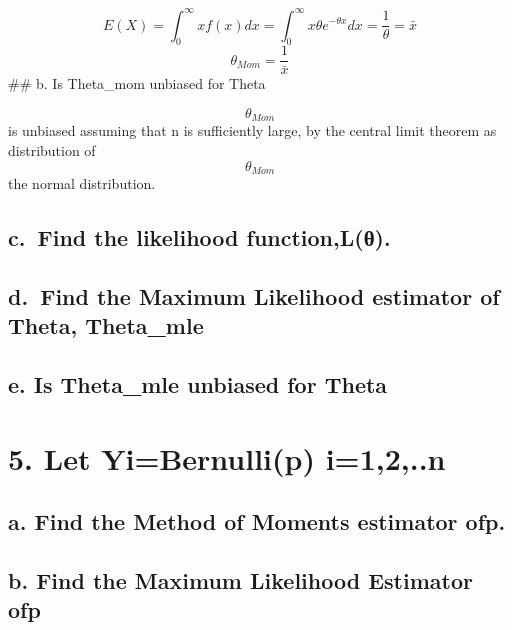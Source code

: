 \documentclass[
]{article}
\begin{document}
\[
E(X) = \int_0^\infty xf(x)dx = \int_0^\infty x\theta e^{-\theta x}dx = \frac{1}{\theta} = \bar{x}
\] \[
\theta_{Mom} = \frac{1}{\bar{x}}
\] \#\# b. Is Theta\_mom unbiased for Theta

\[\theta_{Mom}\] is unbiased assuming that n is sufficiently large, by
the central limit theorem as distribution of \[\theta_{Mom}\] the normal
distribution.

\hypertarget{c.-find-the-likelihood-functionlux3b8.}{%
\subsection{c.~Find the likelihood
function,L(θ).}\label{c.-find-the-likelihood-functionlux3b8.}}

\hypertarget{d.-find-the-maximum-likelihood-estimator-of-theta-theta_mle}{%
\subsection{d.~Find the Maximum Likelihood estimator of Theta,
Theta\_mle}\label{d.-find-the-maximum-likelihood-estimator-of-theta-theta_mle}}

\hypertarget{e.-is-theta_mle-unbiased-for-theta}{%
\subsection{e. Is Theta\_mle unbiased for
Theta}\label{e.-is-theta_mle-unbiased-for-theta}}

\hypertarget{let-yibernullip-i12..n}{%
\section{5. Let Yi=Bernulli(p) i=1,2,..n}\label{let-yibernullip-i12..n}}

\hypertarget{a.-find-the-method-of-moments-estimator-ofp.}{%
\subsection{a. Find the Method of Moments estimator
ofp.}\label{a.-find-the-method-of-moments-estimator-ofp.}}

\hypertarget{b.-find-the-maximum-likelihood-estimator-ofp}{%
\subsection{b. Find the Maximum Likelihood Estimator
ofp}\label{b.-find-the-maximum-likelihood-estimator-ofp}}
\end{document}
